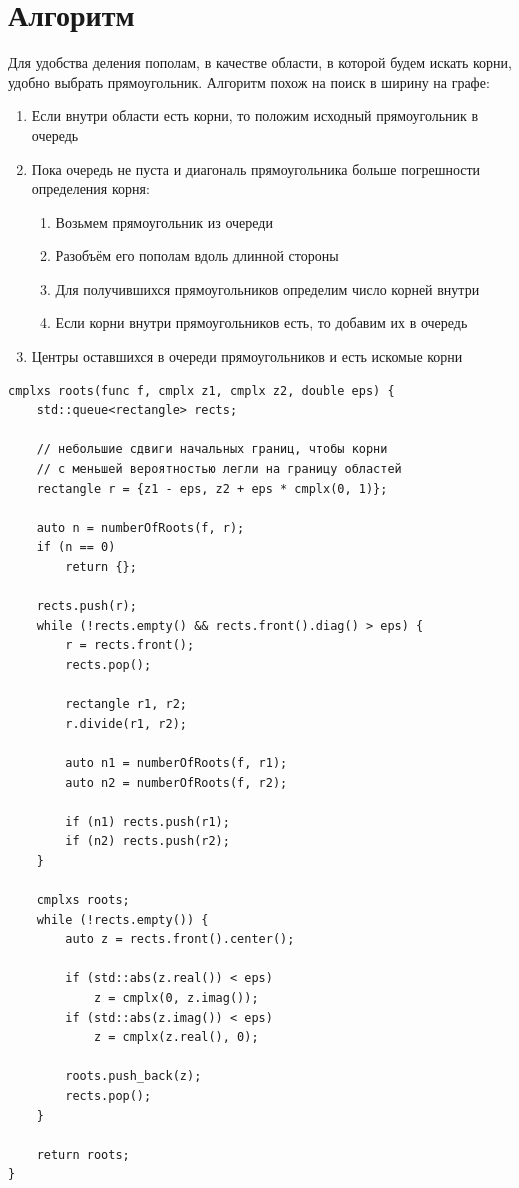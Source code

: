 \documentclass{ncc}
\begin{document}
\section{Алгоритм}
Для удобства деления пополам, в качестве области, в которой будем искать корни, удобно выбрать прямоугольник. Алгоритм похож на поиск в ширину на графе:

\begin{enumerate}
    \item Если внутри области есть корни, то положим исходный прямоугольник в очередь
    \item Пока очередь не пуста и диагональ прямоугольника больше погрешности определения корня:
    \begin{enumerate}
        \item Возьмем прямоугольник из очереди
        \item Разобъём его пополам вдоль длинной стороны
        \item Для получившихся прямоугольников определим число корней внутри
        \item Если корни внутри прямоугольников есть, то добавим их в очередь
    \end{enumerate}
    \item Центры оставшихся в очереди прямоугольников и есть искомые корни
\end{enumerate}

\begin{lstlisting}
cmplxs roots(func f, cmplx z1, cmplx z2, double eps) {
    std::queue<rectangle> rects;

    // небольшие сдвиги начальных границ, чтобы корни
    // с меньшей вероятностью легли на границу областей
    rectangle r = {z1 - eps, z2 + eps * cmplx(0, 1)};

    auto n = numberOfRoots(f, r);
    if (n == 0)
        return {};

    rects.push(r);
    while (!rects.empty() && rects.front().diag() > eps) {
        r = rects.front();
        rects.pop();

        rectangle r1, r2;
        r.divide(r1, r2);

        auto n1 = numberOfRoots(f, r1);
        auto n2 = numberOfRoots(f, r2);

        if (n1) rects.push(r1);
        if (n2) rects.push(r2);
    }

    cmplxs roots;
    while (!rects.empty()) {
        auto z = rects.front().center();

        if (std::abs(z.real()) < eps)
            z = cmplx(0, z.imag());
        if (std::abs(z.imag()) < eps)
            z = cmplx(z.real(), 0);

        roots.push_back(z);
        rects.pop();
    }

    return roots;
}
\end{lstlisting}
\end{document}
